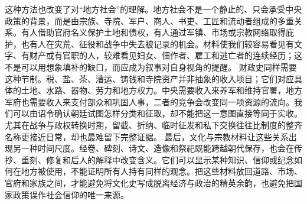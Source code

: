 这种方法也改变了对“地方社会”的理解。地方社会不是一个静止的、只会承受中央政策的背景，而是由宗族、寺院、军户、商人、书吏、工匠和流动者组成的多重关系。有人借助官府名义保护土地和债权，有人通过军镇、市场或宗教网络取得庇护，也有人在灾荒、征役和战争中失去被记录的机会。材料使我们较容易看见有文字、有财产或有官职的人，较难看见妇女、佃作者、雇工和逃亡者的连续经历；这不是可以用想象填补的缺口，而应成为叙事对自身视角的提醒。  财政史同样需要这种节制。税、盐、茶、漕运、铸钱和寺院资产并非抽象的收入项目；它们对应具体的土地、水路、器物、劳力和地方权力。中央需要收入来养军和维持官署，地方军府也需要收入来支付部众和巩固人事，二者的竞争会改变同一项资源的流向。我们可以由诏令确认朝廷试图怎样分类和征取，却不能把这一意图直接等同于实收。尤其在战争与政权转换时期，留截、折纳、临时征发和私下交换往往比制度的整齐名称更接近日常，却也最难留下完整证据。  最后，文化与宗教材料让这些关系出现另一种时间尺度。经卷、碑刻、诗文、造像和祭祀既能跨越朝代保存，也会在传抄、重刻、修复和后人的解释中改变含义。它们可以显示某种知识、信仰或纪念如何在地方被使用，不能证明所有人持有同样的观念。把这些材料放回道路、市场、官府和家族之间，才能避免将文化史写成脱离经济与政治的精英余韵，也避免把国家政策误作社会信仰的唯一来源。